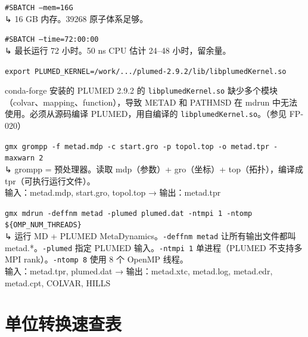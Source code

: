 \documentclass[11pt,a4paper]{article}
\begin{document}
\vspace{3pt}
\noindent\texttt{\textcolor{paramcolor}{\#SBATCH --mem=16G}}\\
\textcolor{notecolor}{↳ 16 GB 内存。39268 原子体系足够。}

\vspace{3pt}
\noindent\texttt{\textcolor{paramcolor}{\#SBATCH --time=72:00:00}}\\
\textcolor{notecolor}{↳ 最长运行 72 小时。50 ns CPU 估计 24--48 小时，留余量。}

\vspace{8pt}
\noindent\texttt{\textcolor{paramcolor}{export PLUMED\_KERNEL=/work/.../plumed-2.9.2/lib/libplumedKernel.so}}

\begin{warnbox}
conda-forge 安装的 PLUMED 2.9.2 的 \texttt{libplumedKernel.so} 缺少多个模块（colvar、mapping、function），导致 METAD 和 PATHMSD 在 mdrun 中无法使用。必须从源码编译 PLUMED，用自编译的 \texttt{libplumedKernel.so}。（参见 FP-020）
\end{warnbox}

\vspace{5pt}
\noindent\texttt{\textcolor{paramcolor}{gmx grompp -f metad.mdp -c start.gro -p topol.top -o metad.tpr -maxwarn 2}}\\
\textcolor{notecolor}{↳ grompp = 预处理器。读取 mdp（参数）+ gro（坐标）+ top（拓扑），编译成 tpr（可执行运行文件）。}\\
\textcolor{iocolor}{输入：metad.mdp, start.gro, topol.top → 输出：metad.tpr}

\vspace{5pt}
\noindent\texttt{\textcolor{paramcolor}{gmx mdrun -deffnm metad -plumed plumed.dat -ntmpi 1 -ntomp \$\{OMP\_NUM\_THREADS\}}}\\
\textcolor{notecolor}{↳ 运行 MD + PLUMED MetaDynamics。\texttt{-deffnm metad} 让所有输出文件都叫 metad.*。\texttt{-plumed} 指定 PLUMED 输入。\texttt{-ntmpi 1} 单进程（PLUMED 不支持多 MPI rank）。\texttt{-ntomp 8} 使用 8 个 OpenMP 线程。}\\
\textcolor{iocolor}{输入：metad.tpr, plumed.dat → 输出：metad.xtc, metad.log, metad.edr, metad.cpt, COLVAR, HILLS}

\newpage
\section{单位转换速查表}
\end{document}

